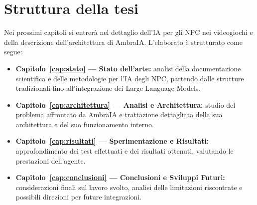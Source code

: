 \section{Struttura della tesi}

Nei prossimi capitoli si entrerà nel dettaglio dell'IA per gli NPC nei videogiochi e della descrizione dell'architettura di AmbraIA. L'elaborato è strutturato come segue:

\begin{itemize}
	\item \textbf{Capitolo~\ref{cap:stato} --- Stato dell'arte:} analisi della documentazione scientifica e delle metodologie per l'IA degli NPC, partendo dalle strutture tradizionali fino all'integrazione dei Large Language Models.
	\item \textbf{Capitolo~\ref{cap:architettura} --- Analisi e Architettura:} studio del problema affrontato da AmbraIA e trattazione dettagliata della sua architettura e del suo funzionamento interno.
	\item \textbf{Capitolo~\ref{cap:risultati} --- Sperimentazione e Risultati:} approfondimento dei test effettuati e dei risultati ottenuti, valutando le prestazioni dell'agente.
	\item \textbf{Capitolo~\ref{cap:conclusioni} --- Conclusioni e Sviluppi Futuri:} considerazioni finali sul lavoro svolto, analisi delle limitazioni riscontrate e possibili direzioni per future integrazioni.
\end{itemize}
